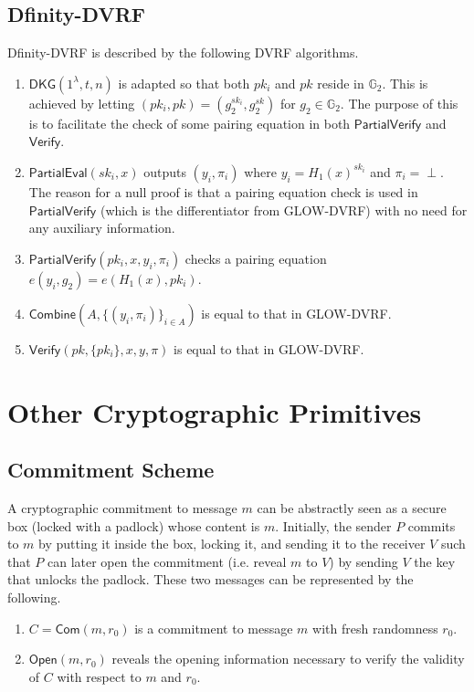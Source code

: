 \documentclass[letterpaper,twocolumn,10pt]{article}
\theoremstyle{definition}
\theoremstyle{remark}
\begin{document}
\subsection{Dfinity-DVRF}
\label{appendix:dfinity-dvrf}
Dfinity-DVRF is described by the following DVRF algorithms.
\begin{enumerate}
\item $\mathsf{DKG}(1^\lambda, t, n)$ is adapted so that both $pk_i$ and $pk$ reside in $\mathbb{G}_2$. This is achieved by letting $(pk_i, pk) = (g_2^{sk_i}, g_2^{sk})$ for $g_2 \in \mathbb{G}_2$. The purpose of this is to facilitate the check of some pairing equation in both $\mathsf{PartialVerify}$ and $\mathsf{Verify}$.
\item $\mathsf{PartialEval}(sk_i, x)$ outputs $(y_i, \pi_i)$ where $y_i = H_1(x)^{sk_i}$ and $\pi_i = \text{$\perp$}$. The reason for a null proof is that a pairing equation check is used in $\mathsf{PartialVerify}$ (which is the differentiator from GLOW-DVRF) with no need for any auxiliary information.
\item $\mathsf{PartialVerify}(pk_i, x, y_i, \pi_i)$ checks a pairing equation $e(y_i, g_2) = e(H_1(x), pk_i)$.
\item $\mathsf{Combine}(A, \{(y_i, \pi_i)\}_{i \in A})$ is equal to that in GLOW-DVRF.
\item $\mathsf{Verify}(pk, \{pk_i\}, x, y, \pi)$ is equal to that in GLOW-DVRF.
\end{enumerate}

\section{Other Cryptographic Primitives}
\subsection{Commitment Scheme}
\label{appendix:commitment}
A cryptographic commitment \cite{blum1983coin} to message $m$ can be abstractly seen as a secure box (locked with a padlock) whose content is $m$. Initially, the sender $P$ commits to $m$ by putting it inside the box, locking it, and sending it to the receiver $V$ such that $P$ can later open the commitment (i.e. reveal $m$ to $V$) by sending $V$ the key that unlocks the padlock. These two messages can be represented by the following.
\begin{enumerate}
\item $C = \mathsf{Com}(m, r_0)$ is a commitment to message $m$ with fresh randomness $r_0$.
\item $\mathsf{Open}(m, r_0)$ reveals the opening information necessary to verify the validity of $C$ with respect to $m$ and $r_0$.
\end{enumerate}
\end{document}
